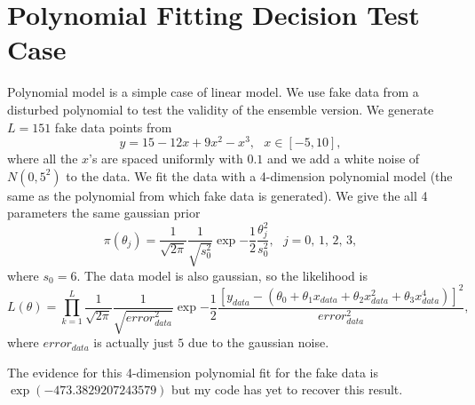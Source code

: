 \section{Polynomial Fitting Decision Test Case}
Polynomial model is a simple case of linear model. We use fake data from a disturbed polynomial to test the validity of the ensemble version. We generate $L=151$ fake data points from
\begin{equation}
y = 15-12x+9x^2-x^3,\,\,\,\,x\in[-5,10],
\end{equation}
where all the $x$'s are spaced uniformly with $0.1$ and we add a white noise of $N(0,5^2)$ to the data. We fit the data with a 4-dimension polynomial model (the same as the polynomial from which fake data is generated). We give the all 4 parameters the same gaussian prior
\begin{equation}
\pi(\theta_j)=\frac{1}{\sqrt{2\pi}}\frac{1}{\sqrt{s_0^2}}\exp{-\frac{1}{2}\frac{\theta_j^2}{s_0^2}},\,\,\,\,j=0,\,1,\,2,\,3,
\end{equation}
where $s_0=6$. The data model is also gaussian, so the likelihood is
\begin{equation}
L(\theta)=\prod_{k=1}^L{\frac{1}{\sqrt{2\pi}}\frac{1}{\sqrt{error_{data}^2}}}\exp{-\frac{1}{2}\frac{[y_{data}-(\theta_0+\theta_1 x_{data}+\theta_2 x_{data}^2+\theta_3 x_{data}^4)]^2}{error_{data}^2}},
\end{equation}
where $error_{data}$ is actually just $5$ due to the gaussian noise.

The evidence for this 4-dimension polynomial fit for the fake data is $\exp{(-473.3829207243579)}$ but my code has yet to recover this result.
